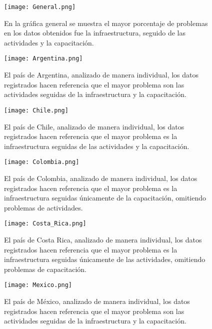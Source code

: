 \documentclass{article}
\begin{document}
\begin{figure}[ht]
    \centering
    \texttt{[image: General.png]}
    \caption{En la gráfica general se muestra el mayor porcentaje de problemas en los datos obtenidos fue la infraestructura, seguido de las actividades y la capacitación. }
    \label{fig:general}
\end{figure}



\begin{figure}[ht]
    \centering
    \texttt{[image: Argentina.png]}
    \caption{El país de Argentina, analizado de manera individual, los datos registrados hacen referencia que el mayor problema son las actividades seguidas de la infraestructura y la capacitación.}
    \label{fig:argentina}
\end{figure}

\begin{figure}[ht]
    \centering
    \texttt{[image: Chile.png]}
    \caption{El país de Chile, analizado de manera individual, los datos registrados hacen referencia que el mayor problema es la infraestructura seguidas de las actividades y la capacitación.}
    \label{fig:chile}
\end{figure}

\begin{figure}[ht]
    \centering
    \texttt{[image: Colombia.png]}
    \caption{El país de Colombia, analizado de manera individual, los datos registrados hacen referencia que el mayor problema es la infraestructura seguidas únicamente de la capacitación, omitiendo problemas de actividades.}
    \label{fig:colombia}
\end{figure}

\begin{figure}[ht]
    \centering
    \texttt{[image: Costa\_Rica.png]}
    \caption{El país de Costa Rica, analizado de manera individual, los datos registrados hacen referencia que el mayor problema es la infraestructura seguidas únicamente de las actividades, omitiendo problemas de capacitación.}
    \label{fig:costa_rica}
\end{figure}

\begin{figure}[ht]
    \centering
    \texttt{[image: Mexico.png]}
    \caption{El país de México, analizado de manera individual, los datos registrados hacen referencia que el mayor problema son las actividades seguidas de la infraestructura y la capacitación.}
    \label{fig:mexico}
\end{figure}
\end{document}
